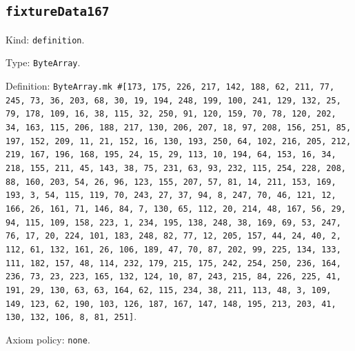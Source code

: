 \documentclass[11pt]{article}
\begin{document}
\subsection*{\texttt{fixtureData167}}
\noindent Kind: \texttt{definition}.\par
\noindent Type: \texttt{ByteArray}.\par
\noindent Definition: \texttt{ByteArray.mk \#[173, 175, 226, 217, 142, 188, 62, 211, 77, 245, 73, 36, 203, 68, 30, 19, 194, 248, 199, 100, 241, 129, 132, 25, 79, 178, 109, 16, 38, 115, 32, 250, 91, 120, 159, 70, 78, 120, 202, 34, 163, 115, 206, 188, 217, 130, 206, 207, 18, 97, 208, 156, 251, 85, 197, 152, 209, 11, 21, 152, 16, 130, 193, 250, 64, 102, 216, 205, 212, 219, 167, 196, 168, 195, 24, 15, 29, 113, 10, 194, 64, 153, 16, 34, 218, 155, 211, 45, 143, 38, 75, 231, 63, 93, 232, 115, 254, 228, 208, 88, 160, 203, 54, 26, 96, 123, 155, 207, 57, 81, 14, 211, 153, 169, 193, 3, 54, 115, 119, 70, 243, 27, 37, 94, 8, 247, 70, 46, 121, 12, 166, 26, 161, 71, 146, 84, 7, 130, 65, 112, 20, 214, 48, 167, 56, 29, 94, 115, 109, 158, 223, 1, 234, 195, 138, 248, 38, 169, 69, 53, 247, 76, 17, 20, 224, 101, 183, 248, 82, 77, 12, 205, 157, 44, 24, 40, 2, 112, 61, 132, 161, 26, 106, 189, 47, 70, 87, 202, 99, 225, 134, 133, 111, 182, 157, 48, 114, 232, 179, 215, 175, 242, 254, 250, 236, 164, 236, 73, 23, 223, 165, 132, 124, 10, 87, 243, 215, 84, 226, 225, 41, 191, 29, 130, 63, 63, 164, 62, 115, 234, 38, 211, 113, 48, 3, 109, 149, 123, 62, 190, 103, 126, 187, 167, 147, 148, 195, 213, 203, 41, 130, 132, 106, 8, 81, 251]}.\par
\noindent Axiom policy: \texttt{none}.\par
\end{document}
